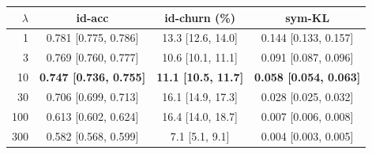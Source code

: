\begin{center}
\small
\begin{tabular}{rccc}
\toprule
$\lambda$ & id-acc & id-churn (\%) & sym-KL \\
\midrule
  1 & 0.781 [0.775, 0.786] & 13.3 [12.6, 14.0] & 0.144 [0.133, 0.157] \\
  3 & 0.769 [0.760, 0.777] & 10.6 [10.1, 11.1] & 0.091 [0.087, 0.096] \\
 10 & \textbf{0.747 [0.736, 0.755]} & \textbf{11.1 [10.5, 11.7]} & \textbf{0.058 [0.054, 0.063]} \\
 30 & 0.706 [0.699, 0.713] & 16.1 [14.9, 17.3] & 0.028 [0.025, 0.032] \\
100 & 0.613 [0.602, 0.624] & 16.4 [14.0, 18.7] & 0.007 [0.006, 0.008] \\
300 & 0.582 [0.568, 0.599] & 7.1 [5.1, 9.1] & 0.004 [0.003, 0.005] \\
\bottomrule
\end{tabular}
\end{center}
